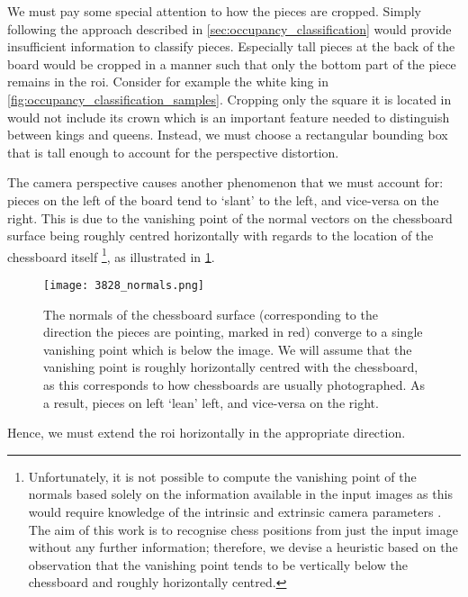 \documentclass[../main.tex]{subfiles}
\begin{document}
We must pay some special attention to how the pieces are cropped. 
Simply following the approach described in \cref{sec:occupancy_classification} would provide insufficient information to classify pieces.
Especially tall pieces at the back of the board would be cropped in a manner such that only the bottom part of the piece remains in the \gls{roi}. 
Consider for example the white king in \cref{fig:occupancy_classification_samples}.
Cropping only the square it is located in would not include its crown which is an important feature needed to distinguish between kings and queens.
Instead, we must choose a rectangular bounding box that is tall enough to account for the perspective distortion.

The camera perspective causes another phenomenon that we must account for: pieces on the left of the board tend to `slant' to the left, and vice-versa on the right.
This is due to the vanishing point of the normal vectors on the chessboard surface being roughly centred horizontally with regards to the location of the chessboard itself%
\footnote{%
    Unfortunately, it is not possible to compute the vanishing point of the normals based solely on the information available in the input images as this would require knowledge of the intrinsic and extrinsic camera parameters \cite{hartley2004}.
    The aim of this work is to recognise chess positions from just the input image without any further information; therefore, we devise a heuristic based on the observation that the vanishing point tends to be vertically below the chessboard and roughly horizontally centred.
}, as illustrated in \cref{fig:occupancy_classification_normals}.
\begin{figure}
    \centering
    \texttt{[image: 3828\_normals.png]}
    \caption[The normals of the chessboard surface converge to a single vanishing point which is below the image.]{The normals of the chessboard surface (corresponding to the direction the pieces are pointing, marked in red) converge to a single vanishing point which is below the image. We will assume that the vanishing point is roughly horizontally centred with the chessboard, as this corresponds to how chessboards are usually photographed. As a result, pieces on left `lean' left, and vice-versa on the right.}
    \label{fig:occupancy_classification_normals}
\end{figure}
Hence, we must extend the \gls{roi} horizontally in the appropriate direction.
\end{document}
